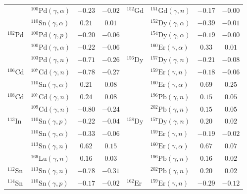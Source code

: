 \begin{table}
\begin{tabular}{llcc|llcc}
    $ $ & $^{100}\mathrm{Pd}(\gamma,\alpha)$ & $-0.23$ & $-0.02$ & $^{152}\mathrm{Gd}$ & $^{151}\mathrm{Gd}(\gamma,n)$ & $-0.17$ & $-0.00$ \\ 
    $ $ & $^{110}\mathrm{Sn}(\gamma,\alpha)$ & $0.21$ & $0.01$ & $ $ & $^{152}\mathrm{Dy}(\gamma,\alpha)$ & $-0.39$ & $-0.01$ \\ 
    $^{102}\mathrm{Pd}$ & $^{100}\mathrm{Pd}(\gamma,p)$ & $-0.20$ & $-0.06$ & $ $ & $^{154}\mathrm{Dy}(\gamma,\alpha)$ & $-0.19$ & $-0.00$ \\ 
    $ $ & $^{100}\mathrm{Pd}(\gamma,\alpha)$ & $-0.22$ & $-0.06$ & $ $ & $^{160}\mathrm{Er}(\gamma,\alpha)$ & $0.33$ & $0.01$ \\ 
    $ $ & $^{103}\mathrm{Pd}(\gamma,n)$ & $-0.71$ & $-0.26$ & $^{156}\mathrm{Dy}$ & $^{157}\mathrm{Dy}(\gamma,n)$ & $-0.21$ & $-0.08$ \\ 
    $^{106}\mathrm{Cd}$ & $^{107}\mathrm{Cd}(\gamma,n)$ & $-0.78$ & $-0.27$ & $ $ & $^{159}\mathrm{Er}(\gamma,n)$ & $-0.18$ & $-0.06$ \\ 
    $ $ & $^{110}\mathrm{Sn}(\gamma,\alpha)$ & $0.21$ & $0.08$ & $ $ & $^{160}\mathrm{Er}(\gamma,\alpha)$ & $0.69$ & $0.25$ \\ 
    $^{108}\mathrm{Cd}$ & $^{107}\mathrm{Cd}(\gamma,n)$ & $0.24$ & $0.08$ & $ $ & $^{196}\mathrm{Pb}(\gamma,n)$ & $0.15$ & $0.05$ \\ 
    $ $ & $^{109}\mathrm{Cd}(\gamma,n)$ & $-0.80$ & $-0.24$ & $ $ & $^{202}\mathrm{Pb}(\gamma,n)$ & $0.15$ & $0.05$ \\ 
    $^{113}\mathrm{In}$ & $^{110}\mathrm{Sn}(\gamma,p)$ & $-0.22$ & $-0.04$ & $^{158}\mathrm{Dy}$ & $^{157}\mathrm{Dy}(\gamma,n)$ & $0.20$ & $0.02$ \\ 
    $ $ & $^{110}\mathrm{Sn}(\gamma,\alpha)$ & $-0.33$ & $-0.06$ & $ $ & $^{159}\mathrm{Er}(\gamma,n)$ & $-0.19$ & $-0.02$ \\ 
    $ $ & $^{113}\mathrm{Sn}(\gamma,n)$ & $0.62$ & $0.15$ & $ $ & $^{160}\mathrm{Er}(\gamma,\alpha)$ & $0.67$ & $0.07$ \\ 
    $ $ & $^{169}\mathrm{Lu}(\gamma,n)$ & $0.16$ & $0.03$ & $ $ & $^{196}\mathrm{Pb}(\gamma,n)$ & $0.16$ & $0.02$ \\ 
    $^{112}\mathrm{Sn}$ & $^{113}\mathrm{Sn}(\gamma,n)$ & $-0.78$ & $-0.31$ & $ $ & $^{202}\mathrm{Pb}(\gamma,n)$ & $0.20$ & $0.02$ \\ 
    $^{114}\mathrm{Sn}$ & $^{110}\mathrm{Sn}(\gamma,p)$ & $-0.17$ & $-0.02$ & $^{162}\mathrm{Er}$ & $^{159}\mathrm{Er}(\gamma,n)$ & $-0.29$ & $-0.12$ \\ 

\end{tabular}
\end{table}
